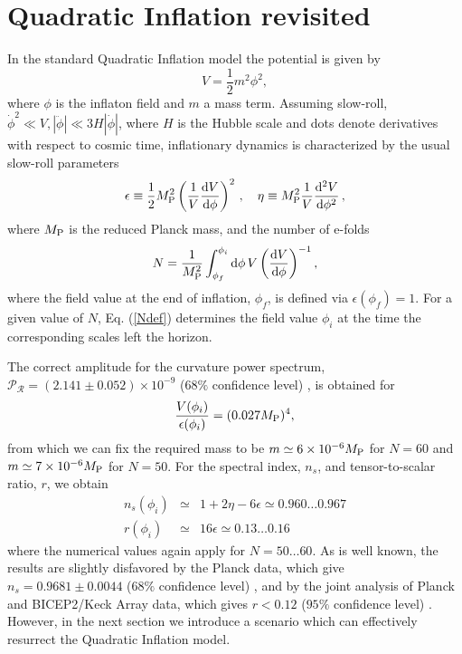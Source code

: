 \documentclass[11pt,a4paper]{article}
\newcommand{\be}{\begin{equation}} %
\newcommand{\ee}{\end{equation}}
\newcommand{\nn}{\nonumber}
\begin{document}
\section{Quadratic Inflation revisited}
\label{quadr_inf_revisited}

In the standard Quadratic Inflation model the potential is given by 
\be
V = \frac{1}{2}m^2\phi^2 ,
\ee
where $\phi$ is the inflaton field and $m$ a mass term. Assuming slow-roll, $\dot{\phi}^2\ll V, |\ddot{\phi}|\ll 3H|\dot{\phi}|$, where $H$ is the Hubble scale and dots denote derivatives with respect to cosmic time, inflationary  dynamics is characterized by the usual slow-roll parameters
\begin{equation}
\label{SRparameters}
\epsilon \equiv \frac{1}{2}M_{\rm P}^2 \left(\frac{1}{V}\frac{{\rm d}V}{{\rm d}\phi}\right)^2 \,, \quad
\eta \equiv M_{\rm P}^2 \frac{1}{V}\frac{{\rm d}^2V}{{\rm d}\phi^2} \,,
\end{equation}	
where $M_{\rm P}$ is the reduced Planck mass, and the number of e-folds
\begin{equation}
N = \frac{1}{M_{\rm P}^2} \int_{\phi_f}^{\phi_i} {\rm d}\phi \, V \left(\frac{{\rm d}V}{{\rm d} \phi}\right)^{-1},
\label{Ndef}
\end{equation}	
where the field value at the end of inflation, $\phi_f$, is defined via $\epsilon(\phi_f) = 1$. For a given value of $N$, Eq. (\ref{Ndef}) determines the field value $\phi_i$ at the time the corresponding scales left the horizon. 

The correct amplitude for the curvature power spectrum, $\mathcal{P}_{\mathcal{R}}=(2.141\pm 0.052)\times 10^{-9}$ ($68\%$ confidence level) \cite{Ade:2015xua}, is obtained for \cite{Lyth:1998xn}
\begin{equation}
\label{cobe}
\frac{V(\phi_i)}{\epsilon(\phi_i)} = (0.027M_{\rm P})^4 ,
\end{equation}
from which we can fix the required mass to be $m\simeq 6\times 10^{-6}M_{\rm P}$ for $N=60$ and $m\simeq 7\times 10^{-6}M_{\rm P}$ for $N=50$. For the spectral index, $n_s$, and tensor-to-scalar ratio, $r$, we obtain
\begin{eqnarray}
\label{nsr}
n_s(\phi_i) &\simeq& 1+2\eta-6\epsilon \simeq 0.960 \dots 0.967 \\ \nn
r(\phi_i) &\simeq& 16\epsilon \simeq 0.13\dots 0.16
\end{eqnarray}
where the numerical values again apply for $N=50\dots 60$. As is well known, the results are slightly disfavored by the Planck data, which give $n_s=0.9681\pm 0.0044$ ($68\%$ confidence level) \cite{Ade:2015xua}, and by the joint analysis of Planck and BICEP2/Keck Array data, which gives $r<0.12$ ($95\%$ confidence level) \cite{Ade:2015tva}. However, in the next section we introduce a scenario which can effectively resurrect the Quadratic Inflation model.
\end{document}
